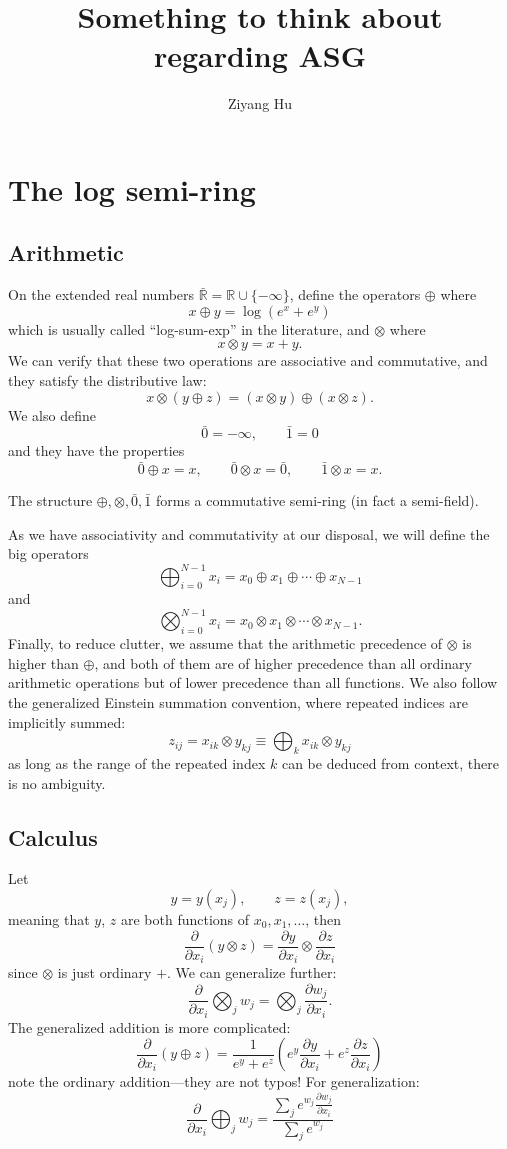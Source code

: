 \documentclass[a4paper]{article}
\title{Something to think about regarding ASG}
\author{Ziyang Hu}
\begin{document}
\maketitle
\tableofcontents
\section{The log semi-ring}

\subsection{Arithmetic}

On the extended real numbers $\bar{\mathbb{R}}=\mathbb{R}\cup \{-\infty\}$, define the operators $\oplus$ where
\[
x \oplus y = \log(e^x+e^y)
\]
which is usually called ``log-sum-exp'' in the literature, and $\otimes$ where
\[
x \otimes y = x + y.
\]
We can verify that these two operations are associative and commutative, and they satisfy the distributive law:
\[
x\otimes(y\oplus z) = (x\otimes y)\oplus(x\otimes z).
\]
We also define
\[
\bar{0} = -\infty, \qquad \bar{1} = 0
\]
and they have the properties
\[
\bar{0}\oplus x = x, \qquad \bar{0}\otimes x = \bar{0}, \qquad \bar{1}\otimes x = x.
\]

The structure $\oplus, \otimes, \bar{0}, \bar{1}$ forms a commutative semi-ring (in fact a semi-field).

As we have associativity and commutativity at our disposal, we will define the big operators
\[
\bigoplus_{i=0}^{N-1} x_i = x_0 \oplus x_1 \oplus \cdots \oplus x_{N-1}
\]
and
\[
\bigotimes_{i=0}^{N-1} x_i = x_0 \otimes x_1 \otimes \cdots \otimes x_{N-1}.
\]
Finally, to reduce clutter, we assume that the arithmetic precedence of $\otimes$ is higher than $\oplus$, and both of them are of higher precedence than all ordinary arithmetic operations but of lower precedence than all functions. We also follow the generalized Einstein summation convention, where repeated indices are implicitly summed:
\[
z_{ij} = x_{ik}\otimes y_{kj} \equiv \bigoplus_{k} x_{ik}\otimes y_{kj}
\]
as long as the range of the repeated index $k$ can be deduced from context, there is no ambiguity.

\subsection{Calculus}

Let
\[
y = y(x_j), \qquad z = z(x_j),
\]
meaning that $y$, $z$ are both functions of $x_0, x_1, \ldots$, then
\[
\frac{\partial}{\partial x_i}(y \otimes z) = \frac{\partial y}{\partial x_i}\otimes\frac{\partial z}{\partial x_i}
\]
since $\otimes$ is just ordinary $+$. We can generalize further:
\[
\frac{\partial}{\partial x_i}\bigotimes_j w_j = \bigotimes_j \frac{\partial w_j}{\partial x_i}.
\]
The generalized addition is more complicated:
\[
\frac{\partial}{\partial x_i}(y\oplus z) = \frac{1}{e^y+e^z}\left(e^y \frac{\partial y}{\partial x_i} + e^z \frac{\partial z}{\partial x_i}\right)
\]
note the ordinary addition---they are not typos! For generalization:
\[
\frac{\partial}{\partial x_i}\bigoplus_j w_j = \frac{\sum_j e^{w_j}\frac{\partial w_j}{\partial x_i}}{\sum_j e^{w_j}}
\]
\end{document}

